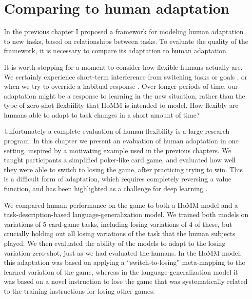 \chapter{Comparing to human adaptation} \label{chapter:human}

In the previous chapter I proposed a framework for modeling human adaptation to new tasks, based on relationships between tasks. To evaluate the quality of the framework, it is necessary to compare its adaptation to human adaptation. \par
It is worth stopping for a moment to consider how flexible humans actually are. We certainly experience short-term interference from switching tasks or goals \citep{Rogers1995}, or when we try to override a habitual response \citep{Stroop1935, MacLeod1991}. Over longer periods of time, our adaptation might be a response to learning in the new situation, rather than the type of zero-shot flexbiility that HoMM is intended to model. How flexibly are humans able to adapt to task changes in a short amount of time? \par
Unfortunately a complete evaluation of human flexibility is a large research program. In this chapter we present an evaluation of human adaptation in one setting, inspired by a motivating example used in the previous chapters. We taught participants a simplified poker-like card game, and evaluated how well they were able to switch to losing the game, after practicing trying to win. This is a difficult form of adaptation, which requires completely reversing a value function, and has been highlighted as a challenge for deep learning \citep{Lake2016}.\par
We compared human performance on the game to both a HoMM model and a task-description-based language-generalization model. We trained both models on variations of 5 card-game tasks, including losing variations of 4 of these, but crucially holding out all losing variations of the task that the human subjects played. We then evaluated the ability of the models to adapt to the losing variation zero-shot, just as we had evaluated the humans. In the HoMM model, this adaptation was based on applying a ``switch-to-losing'' meta-mapping to the learned variation of the game, whereas in the language-generalization model it was based on a novel instruction to lose the game that was systematically related to the training instructions for losing other games.\par 

